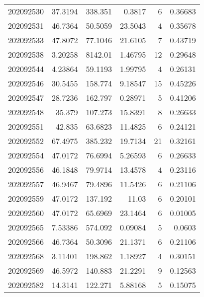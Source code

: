 \begin{tabular}{rrrrrr}
 202092530 &         37.3194  &      338.351  &            0.3817  &           6 & 0.36683 \\
 202092531 &         46.7364  &       50.5059 &           23.5043  &           4 & 0.35678 \\
 202092533 &         47.8072  &       77.1046 &           21.6105  &           7 & 0.43719 \\
 202092538 &          3.20258 &     8142.01   &            1.46795 &          12 & 0.29648 \\
 202092544 &          4.23864 &       59.1193 &            1.99795 &           4 & 0.26131 \\
 202092546 &         30.5455  &      158.774  &            9.18547 &          15 & 0.45226 \\
 202092547 &         28.7236  &      162.797  &            0.28971 &           5 & 0.41206 \\
 202092548 &         35.379   &      107.273  &           15.8391  &           8 & 0.26633 \\
 202092551 &         42.835   &       63.6823 &           11.4825  &           6 & 0.24121 \\
 202092552 &         67.4975  &      385.232  &           19.7134  &          21 & 0.32161 \\
 202092554 &         47.0172  &       76.6994 &            5.26593 &           6 & 0.26633 \\
 202092556 &         46.1848  &       79.9714 &           13.4578  &           4 & 0.23116 \\
 202092557 &         46.9467  &       79.4896 &           11.5426  &           6 & 0.21106 \\
 202092559 &         47.0172  &      137.192  &           11.03    &           6 & 0.20101 \\
 202092560 &         47.0172  &       65.6969 &           23.1464  &           6 & 0.01005 \\
 202092565 &          7.53386 &      574.092  &            0.09084 &           5 & 0.0603  \\
 202092566 &         46.7364  &       50.3096 &           21.1371  &           6 & 0.21106 \\
 202092568 &          3.11401 &      198.862  &            1.18927 &           4 & 0.30151 \\
 202092569 &         46.5972  &      140.883  &           21.2291  &           9 & 0.12563 \\
 202092582 &         14.3141  &      122.271  &            5.88168 &           5 & 0.15075 \\

\end{tabular}
